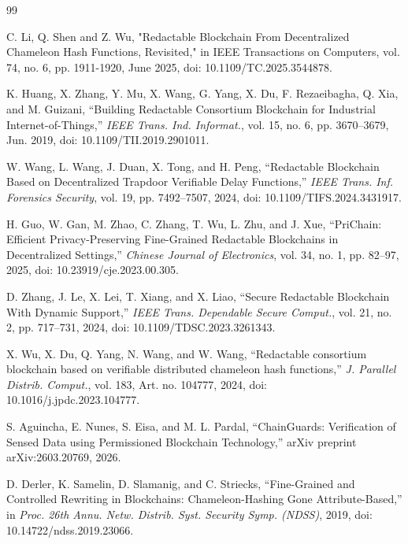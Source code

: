 \documentclass[lettersize,journal]{IEEEtran}
\begin{document}
     \begin{thebibliography}{99}
    
    C. Li, Q. Shen and Z. Wu, "Redactable Blockchain From Decentralized Chameleon Hash Functions, Revisited," in IEEE Transactions on Computers, vol. 74, no. 6, pp. 1911-1920, June 2025, doi: 10.1109/TC.2025.3544878.
    
    
    
    
    K. Huang, X. Zhang, Y. Mu, X. Wang, G. Yang, X. Du, F. Rezaeibagha, Q. Xia, and M. Guizani,
    ``Building Redactable Consortium Blockchain for Industrial Internet-of-Things,''
    \textit{IEEE Trans. Ind. Informat.}, vol. 15, no. 6, pp. 3670--3679, Jun. 2019,
    doi: 10.1109/TII.2019.2901011.
    
    W. Wang, L. Wang, J. Duan, X. Tong, and H. Peng,
    ``Redactable Blockchain Based on Decentralized Trapdoor Verifiable Delay Functions,''
    \textit{IEEE Trans. Inf. Forensics Security}, vol. 19, pp. 7492--7507, 2024,
    doi: 10.1109/TIFS.2024.3431917.
    
    H. Guo, W. Gan, M. Zhao, C. Zhang, T. Wu, L. Zhu, and J. Xue,
    ``PriChain: Efficient Privacy-Preserving Fine-Grained Redactable Blockchains in Decentralized Settings,''
    \textit{Chinese Journal of Electronics}, vol. 34, no. 1, pp. 82--97, 2025,
    doi: 10.23919/cje.2023.00.305.
    
    D. Zhang, J. Le, X. Lei, T. Xiang, and X. Liao,
    ``Secure Redactable Blockchain With Dynamic Support,''
    \textit{IEEE Trans. Dependable Secure Comput.}, vol. 21, no. 2, pp. 717--731, 2024,
    doi: 10.1109/TDSC.2023.3261343.
    
    X. Wu, X. Du, Q. Yang, N. Wang, and W. Wang,
    ``Redactable consortium blockchain based on verifiable distributed chameleon hash functions,''
    \textit{J. Parallel Distrib. Comput.}, vol. 183, Art. no. 104777, 2024,
    doi: 10.1016/j.jpdc.2023.104777.
    
    S. Aguincha, E. Nunes, S. Eisa, and M. L. Pardal,
    ``ChainGuards: Verification of Sensed Data using Permissioned Blockchain Technology,''
    arXiv preprint arXiv:2603.20769, 2026.
    
    D. Derler, K. Samelin, D. Slamanig, and C. Striecks,
    ``Fine-Grained and Controlled Rewriting in Blockchains: Chameleon-Hashing Gone Attribute-Based,''
    in \textit{Proc. 26th Annu. Netw. Distrib. Syst. Security Symp. (NDSS)}, 2019,
    doi: 10.14722/ndss.2019.23066.
    

\end{thebibliography}
\end{document}

